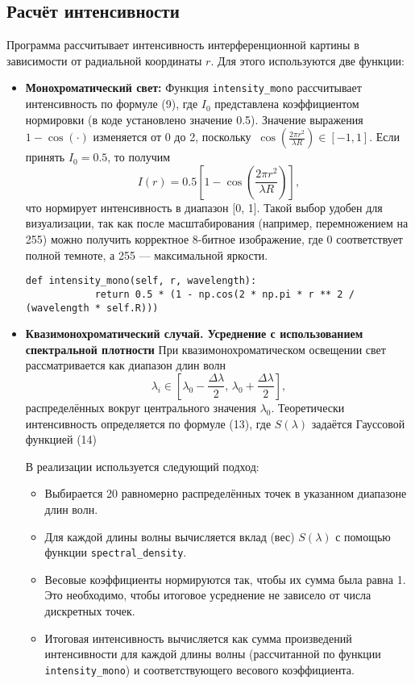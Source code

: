\documentclass[a4paper,11pt]{article}
\theoremstyle{definition}
\begin{document}
    \subsection{Расчёт интенсивности}
    Программа рассчитывает интенсивность интерференционной картины в зависимости от радиальной координаты \( r \).
    Для этого используются две функции:
    \begin{itemize}
        \item \textbf{Монохроматический свет:} Функция \texttt{intensity\_mono} рассчитывает интенсивность
        по формуле (9), где \(I_0\) представлена коэффициентом нормировки (в коде установлено значение 0.5).
        Значение выражения \(1 - \cos(\cdot)\) изменяется от 0 до 2, поскольку
        \(\
            \cos\left(\frac{2\pi r^2}{\lambda R}\right) \in [-1, 1].
        \)
        Если принять \(I_0 = 0.5\), то получим
        \[
            I(r) = 0.5\left[1 - \cos\left(\frac{2\pi r^2}{\lambda R}\right)\right],
        \]
        что нормирует интенсивность в диапазон [0, 1]. Такой выбор удобен для визуализации, так как после масштабирования
        (например, перемножением на 255) можно получить корректное 8-битное изображение, где 0 соответствует полной
        темноте, а 255 --- максимальной яркости.

        \begin{lstlisting}[language=MyPython, label={lst:lstlisting}]
        def intensity_mono(self, r, wavelength):
            return 0.5 * (1 - np.cos(2 * np.pi * r ** 2 / (wavelength * self.R)))
        \end{lstlisting}

        \item{\textbf{Квазимонохроматический случай. Усреднение с использованием спектральной плотности}}
        При квазимонохроматическом освещении свет рассматривается как диапазон длин волн
        \[
        \lambda_i \in \left[\lambda_0 - \frac{\Delta\lambda}{2}, \, \lambda_0 + \frac{\Delta\lambda}{2}\right],
        \]
        распределённых вокруг центрального значения \(\lambda_0\). Теоретически интенсивность
        определяется по формуле (13), где \(S(\lambda)\) задаётся Гауссовой функцией (14)

        В реализации используется следующий подход:
        \begin{itemize}
            \item Выбирается 20 равномерно распределённых точек в указанном диапазоне длин волн.
            \item Для каждой длины волны вычисляется вклад (вес) \( S(\lambda) \) с помощью функции
            \texttt{spectral\_density}.
            \item Весовые коэффициенты нормируются так, чтобы их сумма была равна 1. Это необходимо,
            чтобы итоговое усреднение не зависело от числа дискретных точек.
            \item Итоговая интенсивность вычисляется как сумма произведений интенсивности для каждой длины
            волны (рассчитанной по функции \texttt{intensity\_mono}) и соответствующего весового коэффициента.
        \end{itemize}


\end{itemize}
\end{document}
